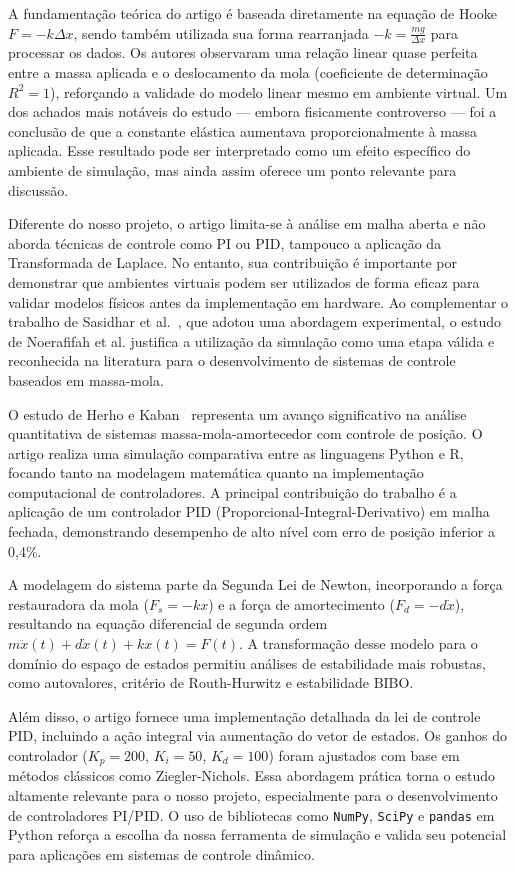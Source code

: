 \documentclass[9pt,a4paper,twocolumn,twoside]{tau-class/tau}
\begin{document}
    A fundamentação teórica do artigo é baseada diretamente na equação de Hooke $F = -k \Delta x$, sendo também utilizada sua forma rearranjada $-k = \frac{mg}{\Delta x}$ para processar os dados. Os autores observaram uma relação linear quase perfeita entre a massa aplicada e o deslocamento da mola (coeficiente de determinação $R^2 = 1$), reforçando a validade do modelo linear mesmo em ambiente virtual. Um dos achados mais notáveis do estudo — embora fisicamente controverso — foi a conclusão de que a constante elástica aumentava proporcionalmente à massa aplicada. Esse resultado pode ser interpretado como um efeito específico do ambiente de simulação, mas ainda assim oferece um ponto relevante para discussão.

    Diferente do nosso projeto, o artigo limita-se à análise em malha aberta e não aborda técnicas de controle como PI ou PID, tampouco a aplicação da Transformada de Laplace. No entanto, sua contribuição é importante por demonstrar que ambientes virtuais podem ser utilizados de forma eficaz para validar modelos físicos antes da implementação em hardware. Ao complementar o trabalho de Sasidhar et al.~\cite{sasidhar2025}, que adotou uma abordagem experimental, o estudo de Noerafifah et al. justifica a utilização da simulação como uma etapa válida e reconhecida na literatura para o desenvolvimento de sistemas de controle baseados em massa-mola.

    O estudo de Herho e Kaban~\cite{herho2025} representa um avanço significativo na análise quantitativa de sistemas massa-mola-amortecedor com controle de posição. O artigo realiza uma simulação comparativa entre as linguagens Python e R, focando tanto na modelagem matemática quanto na implementação computacional de controladores. A principal contribuição do trabalho é a aplicação de um controlador PID (Proporcional-Integral-Derivativo) em malha fechada, demonstrando desempenho de alto nível com erro de posição inferior a 0{,}4\%.

    A modelagem do sistema parte da Segunda Lei de Newton, incorporando a força restauradora da mola ($F_s = -kx$) e a força de amortecimento ($F_d = -d\dot{x}$), resultando na equação diferencial de segunda ordem $m\ddot{x}(t) + d\dot{x}(t) + kx(t) = F(t)$. A transformação desse modelo para o domínio do espaço de estados permitiu análises de estabilidade mais robustas, como autovalores, critério de Routh-Hurwitz e estabilidade BIBO.

    Além disso, o artigo fornece uma implementação detalhada da lei de controle PID, incluindo a ação integral via aumentação do vetor de estados. Os ganhos do controlador ($K_p=200$, $K_i=50$, $K_d=100$) foram ajustados com base em métodos clássicos como Ziegler-Nichols. Essa abordagem prática torna o estudo altamente relevante para o nosso projeto, especialmente para o desenvolvimento de controladores PI/PID. O uso de bibliotecas como \texttt{NumPy}, \texttt{SciPy} e \texttt{pandas} em Python reforça a escolha da nossa ferramenta de simulação e valida seu potencial para aplicações em sistemas de controle dinâmico.
\end{document}
